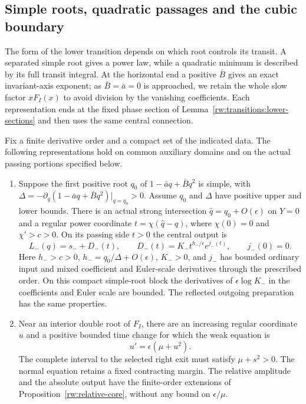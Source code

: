 \subsection{Simple roots, quadratic passages and the cubic boundary}

The form of the lower transition depends on which root controls its
transit.  A separated simple root gives a power law, while a quadratic
minimum is described by its full transit integral.  At the horizontal
end a positive $\bar B$ gives an exact invariant-axis exponent; as
$\bar B=\bar a=0$ is approached, we retain the whole slow factor
$xF_I(x)$ to avoid division by the vanishing coefficients.  Each
representation ends at the fixed phase section of
Lemma~\ref{rw:transitions:lower-sections} and then uses the same
central connection.

\begin{proposition}\label{rw:lower-preparation}
Fix a finite derivative order and a compact set of the indicated data.
The following representations hold on common auxiliary domains and on
the actual passing portions specified below.

\begin{enumerate}[label=(\roman*),leftmargin=*]
\item Suppose the first positive root $q_0$ of
$1-\bar a q+\bar Bq^2$ is simple, with
$\Delta=-\partial_q(1-\bar a q+\bar Bq^2)|_{q=q_0}>0$.
Assume $q_0$ and $\Delta$ have positive upper and lower bounds.
There is an actual strong intersection $\widehat q=q_0+O(\epsilon)$
on $Y=0$ and a regular power coordinate
$t=\chi(\widehat q-q)$, where $\chi(0)=0$ and $\chi'>c>0$.
On its passing side $t>0$ the central output is
\begin{equation}\label{rw:transitions:finite-power}
 L_-(q)=s_-+D_-(t),\qquad
 D_-(t)=K_-t^{h_-/\epsilon}e^{j_-(t)},\qquad j_-(0)=0.
\end{equation}
Here $h_->c>0$, $h_-=q_0/\Delta+O(\epsilon)$, $K_->0$,
and $j_-$ has bounded ordinary input and mixed coefficient and
Euler-scale derivatives through the prescribed order.
On this compact simple-root block the derivatives of
$\epsilon\log K_-$ in the coefficients and Euler scale are bounded.
The reflected outgoing preparation has the same properties.

\item Near an interior double root of $F_I$, there are an increasing
regular coordinate $u$ and a positive bounded time change for which
the weak equation is
\begin{equation}\label{rw:transitions:lower-morse}
 u'=\epsilon(\mu+u^2).
\end{equation}
The complete interval to the selected right exit must satisfy
$\mu+s^2>0$. The normal equation retains a fixed contracting margin.
The relative amplitude and the absolute output have the finite-order
extensions of Proposition~\ref{rw:relative-core}, without any bound
on $\epsilon/\mu$.


\end{enumerate}
\end{proposition}
